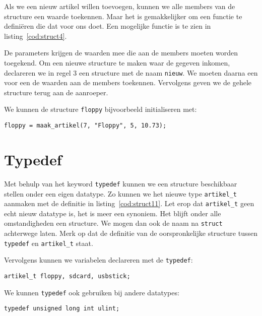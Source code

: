 
Als we een nieuw artikel willen toevoegen, kunnen we alle members van de structure een waarde toekennen. Maar het is gemakkelijker om een functie te definiëren die dat voor ons doet. Een mogelijke functie is te zien in listing~\ref{cod:struct4}.


De parameters krijgen de waarden mee die aan de members moeten worden toegekend. Om een nieuwe structure te maken waar de gegeven inkomen, declareren we in regel 3 een structure met de naam \texttt{nieuw}. We moeten daarna een voor een de waarden aan de members toekennen. Vervolgens geven we de gehele structure terug aan de aanroeper.

We kunnen de structure \texttt{floppy} bijvoorbeeld initialiseren met:

\hspace*{1em}\texttt{floppy = maak\_artikel(7, "Floppy", 5, 10.73);}

\section{Typedef}
Met behulp van het keyword \texttt{typedef} kunnen we een structure beschikbaar stellen onder een eigen datatype. Zo kunnen we het nieuwe type \texttt{artikel\_t} aanmaken met de definitie in listing~\ref{cod:struct11}. Let erop dat \texttt{artikel\_t} geen echt nieuw datatype is, het is meer een synoniem. Het blijft onder alle omstandigheden een structure. We mogen dan ook de naam na \texttt{struct} achterwege laten. Merk op dat de definitie van de oorspronkelijke structure tussen \texttt{typedef} en \texttt{artikel\_t} staat.


Vervolgens kunnen we variabelen declareren met de \texttt{typedef}:

\hspace*{1em}\texttt{artikel\_t floppy, sdcard, usbstick;}

We kunnen \texttt{typedef} ook gebruiken bij andere datatypes:

\hspace*{1em}\texttt{typedef unsigned long int ulint;}

